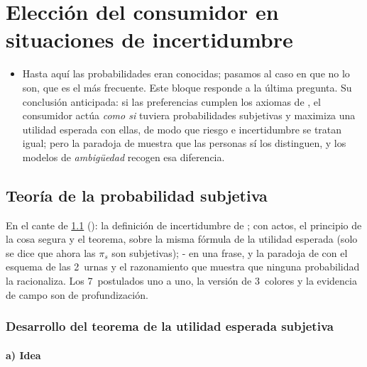 \documentclass[11pt]{article}
\begin{document}
\section{Elección del consumidor en situaciones de incertidumbre}\label{sec:incertidumbre}

\begin{itemize}
\item Hasta aquí las probabilidades eran conocidas; pasamos al caso en que no lo son, que es el más frecuente. Este bloque responde a la última pregunta. Su conclusión anticipada: si las preferencias cumplen los axiomas de , el consumidor actúa \emph{como si} tuviera probabilidades subjetivas y maximiza una utilidad esperada con ellas, de modo que riesgo e incertidumbre se tratan igual; pero la paradoja de  muestra que las personas sí los distinguen, y los modelos de \emph{ambigüedad} recogen esa diferencia.
\end{itemize}

\subsection{Teoría de la probabilidad subjetiva}\label{sec:probabilidad-subjetiva}

\begin{notaopositor}
En el cante de \ref{sec:probabilidad-subjetiva} (): la definición de incertidumbre de ;  con actos, el principio de la cosa segura y el teorema, sobre la misma fórmula de la utilidad esperada (solo se dice que ahora las $\pi_s$ son subjetivas); - en una frase, y la paradoja de  con el esquema de las 2~urnas y el razonamiento que muestra que ninguna probabilidad la racionaliza. Los 7~postulados uno a uno, la versión de 3~colores y la evidencia de campo son de profundización.
\end{notaopositor}

\subsubsection{Desarrollo del teorema de la utilidad esperada subjetiva}\label{sec:teorema-subjetiva}

\paragraph{a) Idea}
\end{document}
